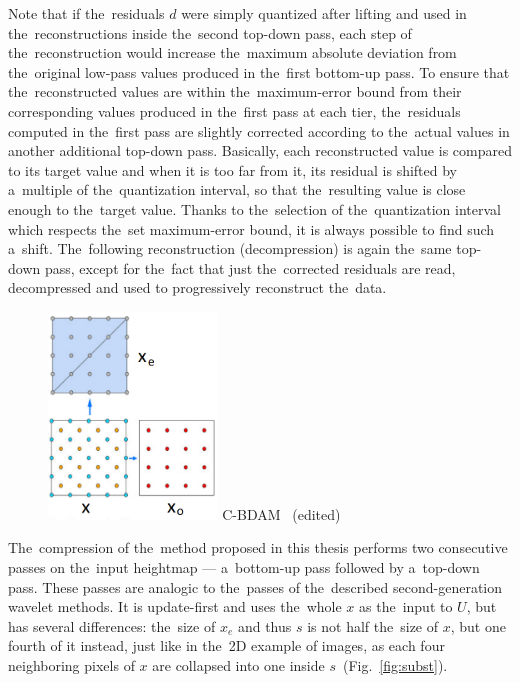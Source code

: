 Note that if the~residuals $d$ were simply quantized after lifting and used in the~reconstructions inside the~second top-down pass, each step of the~reconstruction would increase the~maximum absolute deviation from the~original low-pass values produced in the~first bottom-up pass. To ensure that the~reconstructed values are within the~maximum-error bound from their corresponding values produced in the~first pass at each tier, the~residuals computed in the~first pass are slightly corrected according to the~actual values in another additional top-down pass. Basically, each reconstructed value is compared to its target value and when it is too far from it, its residual is shifted by a~multiple of the~quantization interval, so that the~resulting value is close enough to the~target value. Thanks to the~selection of the~quantization interval which respects the~set maximum-error bound, it is always possible to find such a~shift. The~following reconstruction (decompression) is again the~same top-down pass, except for the~fact that just the~corrected residuals are read, decompressed and used to progressively reconstruct the~data.

\begin{figure}
	\includegraphics[width=0.4\textwidth]{figures/cbdam_lifting.png}\centering
	{C-BDAM~\cite{cbdam} (edited)}
	\label{fig:cbdam_lifting}
\end{figure}

The~compression of the~method proposed in this thesis performs two consecutive passes on the~input heightmap --- a~bottom-up pass followed by a~top-down pass. These passes are analogic to the~passes of the~described second-generation wavelet methods. It is update-first and uses the~whole $x$ as the~input to $U$, but has several differences: the~size of $x_e$ and thus $s$ is not half the~size of $x$, but one fourth of it instead, just like in the~2D example of images, as each four neighboring pixels of $x$ are collapsed into one inside $s$~(Fig.~\ref{fig:subst}). 

